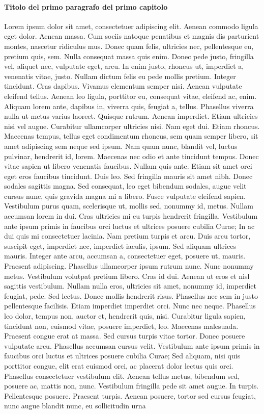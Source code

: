 \paragraph{Titolo del primo paragrafo del primo capitolo}
Lorem ipsum dolor sit amet, consectetuer adipiscing elit. Aenean commodo ligula eget dolor. Aenean massa. Cum sociis natoque penatibus et magnis dis parturient montes, nascetur ridiculus mus. Donec quam felis, ultricies nec, pellentesque eu, pretium quis, sem. Nulla consequat massa quis enim. Donec pede justo, fringilla vel, aliquet nec, vulputate eget, arcu. In enim justo, rhoncus ut, imperdiet a, venenatis vitae, justo. Nullam dictum felis eu pede mollis pretium. Integer tincidunt. Cras dapibus. Vivamus elementum semper nisi. Aenean vulputate eleifend tellus. Aenean leo ligula, porttitor eu, consequat vitae, eleifend ac, enim. Aliquam lorem ante, dapibus in, viverra quis, feugiat a, tellus. Phasellus viverra nulla ut metus varius laoreet. Quisque rutrum. Aenean imperdiet. Etiam ultricies nisi vel augue. Curabitur ullamcorper ultricies nisi. Nam eget dui. Etiam rhoncus. Maecenas tempus, tellus eget condimentum rhoncus, sem quam semper libero, sit amet adipiscing sem neque sed ipsum. Nam quam nunc, blandit vel, luctus pulvinar, hendrerit id, lorem. Maecenas nec odio et ante tincidunt tempus. Donec vitae sapien ut libero venenatis faucibus. Nullam quis ante. Etiam sit amet orci eget eros faucibus tincidunt. Duis leo. Sed fringilla mauris sit amet nibh. Donec sodales sagittis magna. Sed consequat, leo eget bibendum sodales, augue velit cursus nunc, quis gravida magna mi a libero. Fusce vulputate eleifend sapien. Vestibulum purus quam, scelerisque ut, mollis sed, nonummy id, metus. Nullam accumsan lorem in dui. Cras ultricies mi eu turpis hendrerit fringilla. Vestibulum ante ipsum primis in faucibus orci luctus et ultrices posuere cubilia Curae; In ac dui quis mi consectetuer lacinia. Nam pretium turpis et arcu. Duis arcu tortor, suscipit eget, imperdiet nec, imperdiet iaculis, ipsum. Sed aliquam ultrices mauris. Integer ante arcu, accumsan a, consectetuer eget, posuere ut, mauris. Praesent adipiscing. Phasellus ullamcorper ipsum rutrum nunc. Nunc nonummy metus. Vestibulum volutpat pretium libero. Cras id dui. Aenean ut eros et nisl sagittis vestibulum. Nullam nulla eros, ultricies sit amet, nonummy id, imperdiet feugiat, pede. Sed lectus. Donec mollis hendrerit risus. Phasellus nec sem in justo pellentesque facilisis. Etiam imperdiet imperdiet orci. Nunc nec neque. Phasellus leo dolor, tempus non, auctor et, hendrerit quis, nisi. Curabitur ligula sapien, tincidunt non, euismod vitae, posuere imperdiet, leo. Maecenas malesuada. Praesent congue erat at massa. Sed cursus turpis vitae tortor. Donec posuere vulputate arcu. Phasellus accumsan cursus velit. Vestibulum ante ipsum primis in faucibus orci luctus et ultrices posuere cubilia Curae; Sed aliquam, nisi quis porttitor congue, elit erat euismod orci, ac placerat dolor lectus quis orci. Phasellus consectetuer vestibulum elit. Aenean tellus metus, bibendum sed, posuere ac, mattis non, nunc. Vestibulum fringilla pede sit amet augue. In turpis. Pellentesque posuere. Praesent turpis. Aenean posuere, tortor sed cursus feugiat, nunc augue blandit nunc, eu sollicitudin urna 